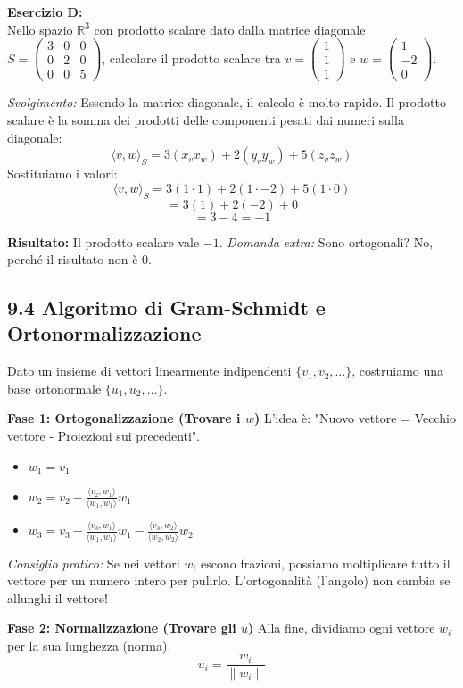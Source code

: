 \documentclass[10pt,a4paper]{article}
\begin{document}
\textbf{Esercizio D: }
\\ Nello spazio $\mathbb{R}^3$ con prodotto scalare dato dalla matrice diagonale $S = \begin{pmatrix} 3 & 0 & 0 \\ 0 & 2 & 0 \\ 0 & 0 & 5 \end{pmatrix}$, calcolare il prodotto scalare tra $v = \begin{pmatrix} 1 \\ 1 \\ 1 \end{pmatrix}$ e $w = \begin{pmatrix} 1 \\ -2 \\ 0 \end{pmatrix}$.

\textit{Svolgimento:}
Essendo la matrice diagonale, il calcolo è molto rapido. Il prodotto scalare è la somma dei prodotti delle componenti pesati dai numeri sulla diagonale:
\[ \langle v, w \rangle_S = 3(x_v x_w) + 2(y_v y_w) + 5(z_v z_w) \]
Sostituiamo i valori:
\[ \langle v, w \rangle_S = 3(1 \cdot 1) + 2(1 \cdot -2) + 5(1 \cdot 0) \]
\[ = 3(1) + 2(-2) + 0 \]
\[ = 3 - 4 = -1 \]

\textbf{Risultato:} Il prodotto scalare vale $-1$.
\textit{Domanda extra:} Sono ortogonali? No, perché il risultato non è 0.

\subsection*{9.4 Algoritmo di Gram-Schmidt e Ortonormalizzazione}

\begin{tcolorbox}[colback=green!5!white,colframe=green!60!black,title=\textbf{}]
Dato un insieme di vettori linearmente indipendenti $\{v_1, v_2, \dots\}$, costruiamo una base ortonormale $\{u_1, u_2, \dots\}$.

\textbf{Fase 1: Ortogonalizzazione (Trovare i $w$)}
L'idea è: "Nuovo vettore = Vecchio vettore - Proiezioni sui precedenti".
\begin{itemize}
    \item $w_1 = v_1$
    \item $w_2 = v_2 - \frac{\langle v_2, w_1 \rangle}{\langle w_1, w_1 \rangle} w_1$
    \item $w_3 = v_3 - \frac{\langle v_3, w_1 \rangle}{\langle w_1, w_1 \rangle} w_1 - \frac{\langle v_3, w_2 \rangle}{\langle w_2, w_2 \rangle} w_2$
\end{itemize}
\textit{Consiglio pratico:} Se nei vettori $w_i$ escono frazioni, possiamo moltiplicare tutto il vettore per un numero intero per pulirlo. L'ortogonalità (l'angolo) non cambia se allunghi il vettore!

\textbf{Fase 2: Normalizzazione (Trovare gli $u$)}
Alla fine, dividiamo ogni vettore $w_i$ per la sua lunghezza (norma).
\[ u_i = \frac{w_i}{\|w_i\|} \]
\end{tcolorbox}
\end{document}
